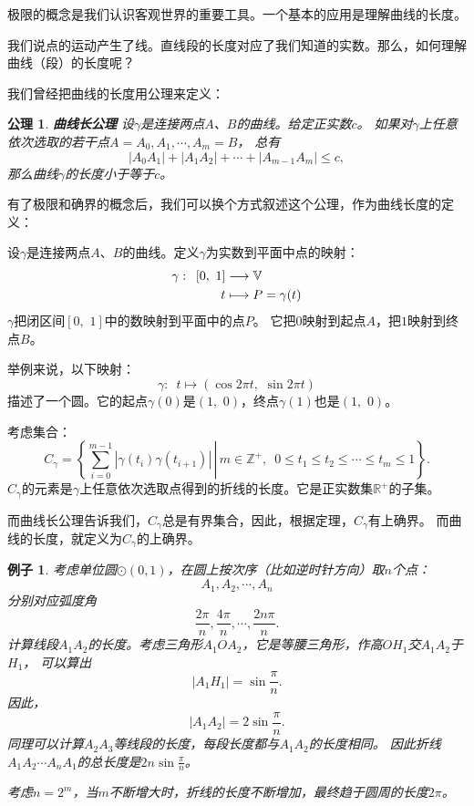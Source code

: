 \documentclass[12pt,UTF8]{ctexbook}
\newtheorem{ex}{例子}[section]
\newtheorem*{po}{公理}
\begin{document}
极限的概念是我们认识客观世界的重要工具。一个基本的应用是理解曲线的长度。

我们说点的运动产生了线。直线段的长度对应了我们知道的实数。那么，如何理解曲线（段）的长度呢？

我们曾经把曲线的长度用公理来定义：

\begin{po}{\textbf{曲线长公理}}
    设$\gamma$是连接两点$A$、$B$的曲线。给定正实数$c$。
    如果对$\gamma$上任意依次选取的若干点$A = A_0, A_1, \cdots , A_m = B$，
    总有
    $$ |A_0A_1| + |A_1A_2| + \cdots + |A_{m-1}A_m| \leqslant c,$$
    那么曲线$\gamma$的长度小于等于$c$。
\end{po}

有了极限和确界的概念后，我们可以换个方式叙述这个公理，作为曲线长度的定义：

设$\gamma$是连接两点$A$、$B$的曲线。定义$\gamma$为实数到平面中点的映射：
\begin{align}
    \gamma : \,\,\, [0,\,\,1] &\longrightarrow \mathbb{V} \notag \\
    t &\longmapsto P = \gamma(t)
\end{align}
$\gamma$把闭区间$[0,\,\,1]$中的数映射到平面中的点$P$。
它把$0$映射到起点$A$，把$1$映射到终点$B$。

举例来说，以下映射：
$$ \gamma : \,\,\, t \mapsto (\cos{2\pi t}, \,\, \sin{2\pi t})$$
描述了一个圆。它的起点$\gamma(0)$是$(1,\,\,0)$，终点$\gamma(1)$也是$(1,\,\,0)$。

考虑集合：
$$ C_\gamma = \left\{\left. \sum_{i=0}^{m-1} |\gamma(t_i)\gamma(t_{i+1})|\, \right| \, m\in\mathbb{Z}^+,\,\,\, 0\leqslant t_1 \leqslant t_2 \leqslant \cdots \leqslant t_m\leqslant 1 \right\}.$$
$C_\gamma$的元素是$\gamma$上任意依次选取点得到的折线的长度。它是正实数集$\mathbb{R}^+$的子集。

而曲线长公理告诉我们，$C_\gamma$总是有界集合，因此，根据定理\label{tm:2-2-10}，$C_\gamma$有上确界。
而曲线的长度，就定义为$C_\gamma$的上确界。

\begin{ex}
    考虑单位圆$\odot(0, 1)$，在圆上按次序（比如逆时针方向）取$n$个点：
    $$ A_1, A_2, \cdots , A_n $$
    分别对应弧度角
    $$\frac{2\pi}{n}, \frac{4\pi}{n}, \cdots , \frac{2n\pi}{n}.$$
    计算线段$A_1A_2$的长度。考虑三角形$A_1OA_2$，它是等腰三角形，作高$OH_1$交$A_1A_2$于$H_1$，
    可以算出
    $$ |A_1H_1| = \sin{\frac{\pi}{n}}.$$
    因此，
    $$ |A_1A_2| = 2\sin{\frac{\pi}{n}}.$$
    同理可以计算$A_2A_3$等线段的长度，每段长度都与$A_1A_2$的长度相同。
    因此折线$A_1A_2\cdots A_nA_1$的总长度是$2n\sin{\frac{\pi}{n}}$。

    考虑$n=2^m$，当$m$不断增大时，折线的长度不断增加，最终趋于圆周的长度$2\pi$。
\end{ex}
\end{document}
